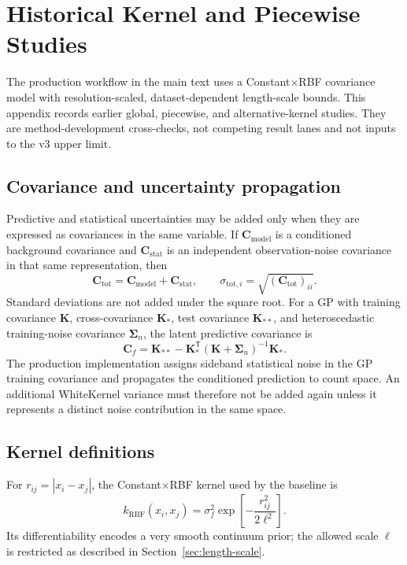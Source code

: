 \section{Historical Kernel and Piecewise Studies}
\label{app:kernel-studies}

The production workflow in the main text uses a Constant$\times$RBF covariance model
with resolution-scaled, dataset-dependent length-scale bounds. This appendix records
earlier global, piecewise, and alternative-kernel studies. They are method-development
cross-checks, not competing result lanes and not inputs to the v3 upper limit.

\subsection{Covariance and uncertainty propagation}

Predictive and statistical uncertainties may be added only when they are expressed as
covariances in the same variable. If $\bm C_{\mathrm{model}}$ is a conditioned
background covariance and $\bm C_{\mathrm{stat}}$ is an independent observation-noise
covariance in that same representation, then
\begin{equation}
\bm C_{\mathrm{tot}}
=
\bm C_{\mathrm{model}}+\bm C_{\mathrm{stat}},
\qquad
\sigma_{\mathrm{tot},i}
=
\sqrt{(\bm C_{\mathrm{tot}})_{ii}} .
\label{eq:appendix-covariance-addition}
\end{equation}
Standard deviations are not added under the square root. For a GP with training
covariance $\bm K$, cross-covariance $\bm K_*$, test covariance $\bm K_{**}$, and
heteroscedastic training-noise covariance $\bm\Sigma_n$, the latent predictive
covariance is
\begin{equation}
\bm C_f
=
\bm K_{**}
-\bm K_*^\mathsf{T}
  (\bm K+\bm\Sigma_n)^{-1}
  \bm K_* .
\label{eq:appendix-gp-predictive-covariance}
\end{equation}
The production implementation assigns sideband statistical noise in the GP training
covariance and propagates the conditioned prediction to count space. An additional
WhiteKernel variance must therefore not be added again unless it represents a distinct
noise contribution in the same space.

\subsection{Kernel definitions}

For $r_{ij}=|x_i-x_j|$, the Constant$\times$RBF kernel used by the baseline is
\begin{equation}
k_{\mathrm{RBF}}(x_i,x_j)
=
\sigma_f^2
\exp\!\left[-\frac{r_{ij}^2}{2\ell^2}\right].
\label{eq:appendix-rbf}
\end{equation}
Its differentiability encodes a very smooth continuum prior; the allowed scale
$\ell$ is restricted as described in Section~\ref{sec:length-scale}.

